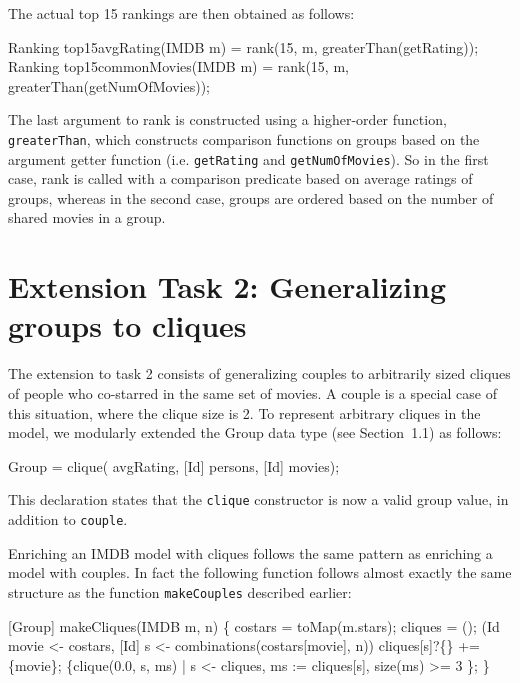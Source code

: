 \documentclass[submission,copyright,creativecommons]{eptcs}
\begin{document}
The actual top 15 rankings are then obtained as follows:
\begin{rascal}
Ranking top15avgRating(IMDB m)    = rank(15, m, greaterThan(getRating));    
Ranking top15commonMovies(IMDB m) = rank(15, m, greaterThan(getNumOfMovies));
\end{rascal}

The last argument to rank is constructed using a higher-order function, \texttt{greaterThan}, which constructs comparison functions on groups based on the argument getter function (i.e. \texttt{getRating} and \texttt{getNumOfMovies}). So in the first case, rank is called with a comparison predicate based on average ratings of groups, whereas in the second case, groups are ordered based on the number of shared movies in a group.


\section*{Extension Task 2: Generalizing groups to cliques}

The extension to task 2 consists of generalizing couples to arbitrarily sized cliques of people who co-starred in the same set of movies. A couple is a special case of this situation, where the clique size is 2. 
To represent arbitrary cliques in the model, we modularly extended the Group data type (see Section~1.1) as follows:

\begin{rascal}
 Group = clique( avgRating, [Id] persons, [Id] movies);
\end{rascal}

This declaration states that the \texttt{clique} constructor is now a valid group value, in addition to \texttt{couple}. 

Enriching an IMDB model with cliques follows the same pattern as enriching a model with couples. In fact the following function follows almost exactly the same structure as the function \texttt{makeCouples} described earlier:

\begin{rascal}
[Group] makeCliques(IMDB m,  n) \{{}
    costars = toMap(m.stars); cliques = ();
     (Id movie \textless{}- costars, [Id] s \textless{}- combinations(costars{}[movie], n))
      cliques{}[s]?\{\} += \{{}movie\}{};
     \{{}clique(0.0, s, ms) | s \textless{}- cliques, ms := cliques{}[s], size(ms) \textgreater{}= 3 \}{};
\}{}
\end{rascal}
\end{document}
